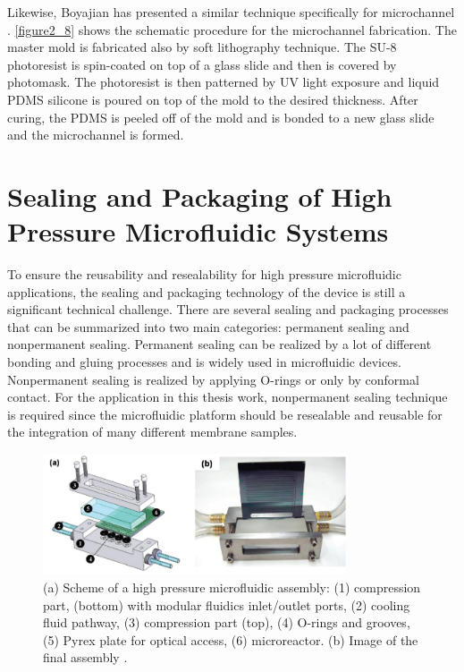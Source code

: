 Likewise, Boyajian has presented a similar technique specifically for microchannel \cite{boyajian2010microchannel}. \autoref{figure2_8} shows the schematic procedure for the microchannel fabrication. The master mold is fabricated also by soft lithography technique. The SU-8 photoresist is spin-coated on top of a glass slide and then is covered by photomask. The photoresist is then patterned by UV light exposure and liquid PDMS silicone is poured on top of the mold to the desired thickness. After curing, the PDMS is peeled off of the mold and is bonded to a new glass slide and the microchannel is formed.

\section{Sealing and Packaging of High Pressure Microfluidic Systems}
\label{2_3}
To ensure the reusability and resealability for high pressure microfluidic applications, the sealing and packaging technology of the device is still a significant technical challenge. There are several sealing and packaging processes that can be summarized into two main categories: permanent sealing and nonpermanent sealing. Permanent sealing can be realized by a lot of different bonding and gluing processes and is widely used in microfluidic devices. Nonpermanent sealing is realized by applying O-rings or only by conformal contact. For the application in this thesis work, nonpermanent sealing technique is required since the microfluidic platform should be resealable and reusable for the integration of many different membrane samples.\\

\begin{figure}[!b]%
\centering
\includegraphics[width=0.8\textwidth]{figures/literaturereview/figure2_9}%
\caption{(a) Scheme of a high pressure microfluidic assembly: (1) compression part, (bottom) with modular fluidics inlet/outlet ports, (2) cooling fluid pathway, (3) compression part (top), (4) O-rings and grooves, (5) Pyrex plate for optical access, (6) microreactor. (b) Image of the final assembly \cite{marre2010design}.}%
\label{figure2_9}%
\end{figure}

